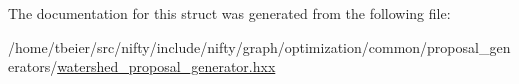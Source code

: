 The documentation for this struct was generated from the following file\+:\begin{DoxyCompactItemize}
\item 
/home/tbeier/src/nifty/include/nifty/graph/optimization/common/proposal\+\_\+generators/\hyperlink{common_2proposal__generators_2watershed__proposal__generator_8hxx}{watershed\+\_\+proposal\+\_\+generator.\+hxx}\end{DoxyCompactItemize}
